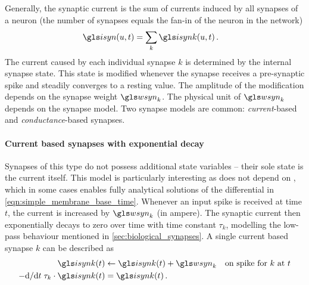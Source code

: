 Generally, the synaptic current \isyn is the sum of currents induced by all synapses of a neuron (the number of synapses equals the fan-in of the neuron in the network)
\begin{align}
	\isyn(u, t) &= \sum_{k} \isynk(u, t) \,.
	\label{eqn:synaptic_sum}
\end{align}
The current \isynk caused by each individual synapse $k$ is determined by the internal synapse state. This state is modified whenever the synapse receives a pre-synaptic spike and steadily converges to a resting value. The amplitude of the modification depends on the synapse weight $\wsyn_k$. The physical unit of $\wsyn_k$ depends on the synapse model. Two synapse models are common: \emph{current}-based and \emph{conductance}-based synapses.

\paragraph{Current based synapses with exponential decay}
Synapses of this type do not possess additional state variables -- their sole state is the current \isynk itself. This model is particularly interesting as \isynk does not depend on \um, which in some cases enables fully analytical solutions of the differential in \cref{eqn:simple_membrane_base_time}. Whenever an input spike is received at time $t$, the current is increased by $\wsyn_k$ (in ampere). The synaptic current then exponentially decays to zero over time with time constant $\tau_k$, modelling the low-pass behaviour mentioned in \cref{sec:biological_synapses}. A single current based synapse $k$ can be described as
\begin{align}
	\isynk(t) &\gets \isynk(t) + \wsyn_k \quad \text{on spike for $k$ at } t
	\label{eqn:current_based_sypase} \\
	- \mathrm{d}/\mathrm{d}t \; \tau_k \cdot \isynk(t) &= \isynk(t) \,.
	\label{eqn:current_based_sypase_decay}
\end{align}

